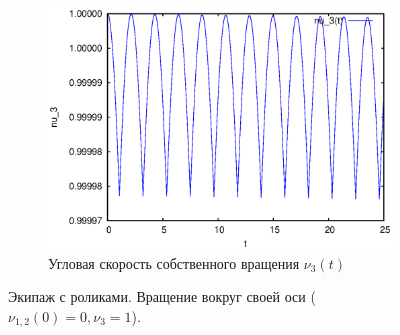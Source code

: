 \begin{figure}
\begin{subfigure}[t]{0.3\textwidth}
        \includegraphics[width=\linewidth]{pic/rol__self_rot__velocity_of_self_rotation}
        \caption{Угловая скорость собственного вращения $\nu_3(t)$}
        \label{fig:rol__self_rot__velocity_of_self_rotation}    
    \end{subfigure}

    \caption{Экипаж с роликами. Вращение вокруг своей оси ($\nu_{1,2}(0) = 0, \nu_3 = 1$).}
    \label{fig:selfrot}
    
\end{figure}

